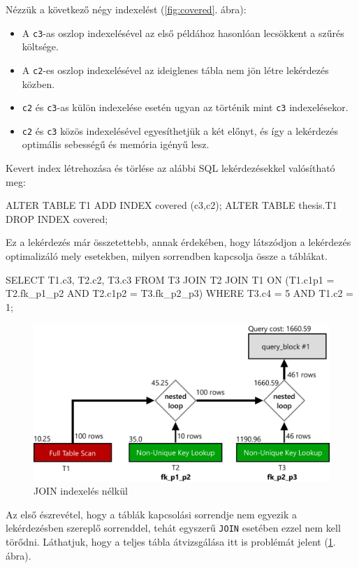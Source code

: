 Nézzük a következő négy indexelést (\ref{fig:covered}. ábra):
\begin{itemize} 
\item A \texttt{c3}-as oszlop indexelésével az első példához hasonlóan lecsökkent a szűrés költsége.
\item A \texttt{c2}-es oszlop indexelésével az ideiglenes tábla nem jön létre lekérdezés közben.
\item \texttt{c2} és \texttt{c3}-as külön indexelése esetén ugyan az történik mint \texttt{c3} indexelésekor.
\item \texttt{c2} és \texttt{c3} közös indexelésével egyesíthetjük a két előnyt, és így a lekérdezés optimális sebességű és memória igényű lesz.
\end{itemize} 
Kevert index létrehozása és törlése az alábbi SQL lekérdezésekkel valósítható meg:
\begin{python}
ALTER TABLE T1 ADD INDEX covered (c3,c2);
ALTER TABLE thesis.T1 DROP INDEX covered;
\end{python}


Ez a lekérdezés már összetettebb, annak érdekében, hogy látszódjon a lekérdezés optimalizáló mely esetekben, milyen sorrendben kapcsolja össze a táblákat.
\begin{python}
SELECT T1.c3, T2.c2, T3.c3
FROM T3 JOIN T2 JOIN T1 
    ON (T1.c1p1 = T2.fk_p1_p2 AND T2.c1p2 = T3.fk_p2_p3) 
WHERE T3.c4 = 5 AND T1.c2 = 1;
\end{python}

\begin{figure}[h!]
\centering
\includegraphics[width=14cm]{images/explain/3-1.png}
\caption{JOIN indexelés nélkül}
\label{fig:explain_3_1}
\end{figure}

Az első észrevétel, hogy a táblák kapcsolási sorrendje nem egyezik a lekérdezésben szereplő sorrenddel, tehát egyszerű \texttt{JOIN} esetében ezzel nem kell törődni. Láthatjuk, hogy a teljes tábla átvizsgálása itt is problémát jelent (\ref{fig:explain_3_1}. ábra). 

